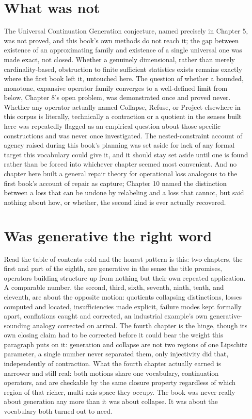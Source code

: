 \documentclass[11pt]{report}
\begin{document}
\section*{What was not}

The Universal Continuation Generation conjecture, named precisely in
Chapter 5, was not proved, and this book's own methods do not reach
it; the gap between existence of an approximating family and
existence of a single universal one was made exact, not closed.
Whether a genuinely dimensional, rather than merely cardinality-based,
obstruction to finite sufficient statistics exists remains exactly
where the first book left it, untouched here. The question of whether
a bounded, monotone, expansive operator family converges to a
well-defined limit from below, Chapter 8's open problem, was
demonstrated once and proved never. Whether any operator actually
named Collapse, Refuse, or Project elsewhere in this corpus is
literally, technically a contraction or a quotient in the senses
built here was repeatedly flagged as an empirical question about
those specific constructions and was never once investigated. The
nested-constraint account of agency raised during this book's
planning was set aside for lack of any formal target this vocabulary
could give it, and it should stay set aside until one is found rather
than be forced into whichever chapter seemed most convenient. And no
chapter here built a general repair theory for operational loss
analogous to the first book's account of repair as capture; Chapter
10 named the distinction between a loss that can be undone by
relabeling and a loss that cannot, but said nothing about how, or
whether, the second kind is ever actually recovered.

\section*{Was generative the right word}

Read the table of contents cold and the honest pattern is this: two
chapters, the first and part of the eighth, are generative in the
sense the title promises, operators building structure up from
nothing but their own repeated application. A comparable number,
the second, third, sixth, seventh, ninth, tenth, and eleventh, are
about the opposite motion: quotients collapsing distinctions, losses
computed and located, insufficiencies made explicit, failure modes
kept formally apart, conflations caught and corrected, an industrial
example's own generative-sounding analogy corrected on arrival. The
fourth chapter
is the hinge, though its own closing claim had to be corrected before
it could bear the weight this paragraph puts on it: generation and
collapse are not two regions of one Lipschitz parameter, a single
number never separated them, only injectivity did that, independently
of contraction. What the fourth chapter actually earned is narrower
and still real: both motions share one vocabulary, continuation
operators, and are checkable by the same closure property regardless
of which region of that richer, multi-axis space they occupy. The
book was never really about generation any more than it was about
collapse. It was about the vocabulary both turned out to need.
\end{document}
